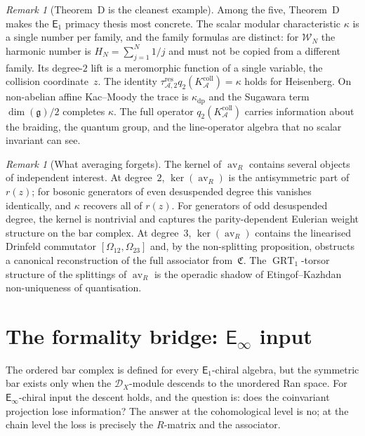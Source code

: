 \documentclass[11pt,reqno]{amsart}
\theoremstyle{definition}
\theoremstyle{remark}
\newtheorem{remark}[theorem]{Remark}
\newcommand{\cA}{\mathcal{A}}
\newcommand{\cD}{\mathcal{D}}
\newcommand{\cW}{\mathcal{W}}
\newcommand{\Eone}{\mathsf{E}_{1}}
\newcommand{\Einf}{\mathsf{E}_{\infty}}
\DeclareMathOperator{\av}{av}
\DeclareMathOperator{\GRT}{GRT}
\newcommand{\fg}{\mathfrak{g}}
\numberwithin{equation}{section}
\begin{document}
\begin{remark}[Theorem~D is the cleanest example]
\label{rem:thm-d-cleanest}
Among the five, Theorem~D makes the $\Eone$ primacy thesis most
concrete. The scalar modular characteristic $\kappa$ is a single
number per family, and the family formulas are distinct: for $\cW_N$
the harmonic number is $H_N = \sum_{j=1}^N 1/j$ and must not be
copied from a different family. Its degree-$2$ lift is a meromorphic
function of a single variable, the collision coordinate~$z$. The
identity $\tau_{\cA,2}^{\mathrm{res}}q_2(K_\cA^{\mathrm{coll}})
=\kappa$ holds for Heisenberg. On non-abelian affine Kac--Moody the
trace is $\kappa_{\mathrm{dp}}$ and the Sugawara term
$\dim(\fg)/2$ completes $\kappa$. The full operator
$q_2(K_\cA^{\mathrm{coll}})$ carries information about the braiding, the
quantum group, and the line-operator algebra that no scalar invariant
can see.
\end{remark}

\begin{remark}[What averaging forgets]
\label{rem:what-av-forgets}
The kernel of $\av_R$ contains several objects of independent interest.
At degree~$2$, $\ker(\av_R)$ is the antisymmetric part of $r(z)$; for
bosonic generators of even desuspended degree this vanishes
identically, and $\kappa$ recovers all of $r(z)$. For generators of
odd desuspended degree, the kernel is nontrivial and captures the
parity-dependent Eulerian weight structure on the bar complex. At
degree~$3$, $\ker(\av_R)$ contains the linearised Drinfeld commutator
$[\Omega_{12}, \Omega_{23}]$ and, by the non-splitting proposition,
obstructs a canonical reconstruction of the full associator
from~$\mathfrak{C}$. The $\GRT_1$-torsor structure of the splittings
of $\av_R$ is the operadic shadow of Etingof--Kazhdan non-uniqueness
of quantisation.
\end{remark}

\section{The formality bridge: $\Einf$ input}
\label{sec:formality-bridge}

The ordered bar complex is defined for every $\Eone$-chiral algebra,
but the symmetric bar exists only when the $\cD_X$-module descends
to the unordered Ran space. For $\Einf$-chiral input the descent
holds, and the question is: does the coinvariant projection lose
information? The answer at the cohomological level is no; at the
chain level the loss is precisely the $R$-matrix and the associator.
\end{document}
